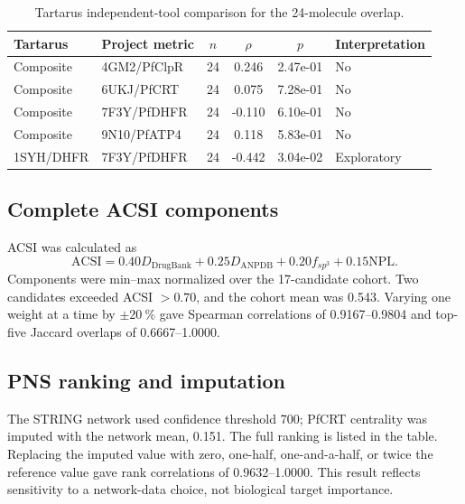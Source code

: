 \begin{table}[htbp]
\centering
\caption{Tartarus independent-tool comparison for the \num{24}-molecule overlap.}
\label{tab:secondary_tartarus_correlation}
\begin{tabularx}{\textwidth}{>{\raggedright\arraybackslash}X >{\raggedright\arraybackslash}X S[table-format=2.0] S[table-format=-1.3] S[table-format=1.2e2] >{\raggedright\arraybackslash}X}
\toprule
Tartarus & Project metric & {$n$} & {$\rho$} & {$p$} & {Interpretation} \\
\midrule
Composite & 4GM2/PfClpR & 24 & 0.246 & 2.47e-01 & No \\
Composite & 6UKJ/PfCRT & 24 & 0.075 & 7.28e-01 & No \\
Composite & 7F3Y/PfDHFR & 24 & -0.110 & 6.10e-01 & No \\
Composite & 9N10/PfATP4 & 24 & 0.118 & 5.83e-01 & No \\
1SYH/DHFR & 7F3Y/PfDHFR & 24 & -0.442 & 3.04e-02 & Exploratory \\
\bottomrule
\end{tabularx}
\end{table}

\subsection*{Complete ACSI components}

ACSI was calculated as
\[
\mathrm{ACSI}=0.40D_{\mathrm{DrugBank}}+0.25D_{\mathrm{ANPDB}}+0.20f_{sp^3}+0.15\mathrm{NPL}.
\]
Components were min--max normalized over the 17-candidate cohort. Two candidates exceeded ACSI $>\num{0.70}$, and the cohort mean was \num{0.543}. Varying one weight at a time by $\pm\qty{20}{\percent}$ gave Spearman correlations of \numrange{0.9167}{0.9804} and top-five Jaccard overlaps of \numrange{0.6667}{1.0000}.

\subsection*{PNS ranking and imputation}

The STRING\citep{string_2023} network used confidence threshold \num{700}; PfCRT centrality was imputed with the network mean, \num{0.151}. The full ranking is listed in the table. Replacing the imputed value with zero, one-half, one-and-a-half, or twice the reference value gave rank correlations of \numrange{0.9632}{1.0000}. This result reflects sensitivity to a network-data choice, not biological target importance.

